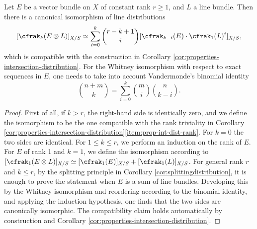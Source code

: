 \begin{proposition}\label{prop:Cherntensorproductwithline}
Let $E$ be a vector bundle on $X$ of constant rank $r\geq 1$, and $L$ a line bundle. Then there is a canonical isomorphism of line distributions
\begin{equation}\label{eq:ck-tensor-product}
[\cfrak_k(E \otimes L)]_{X/S} \simeq \sum_{i=0}^{k} \binom{r-k+1}{i} [\cfrak_{k-i}(E) \cdot \cfrak_1(L)^{i}]_{X/S},
\end{equation}
which is compatible with the construction in Corollary \ref{cor:properties-intersection-distribution}. For the Whitney isomorphism with respect to exact sequences in $E$, one needs to take into account Vandermonde's binomial identity
\begin{displaymath}
\binom{n + m}{k} = \sum_{i=0}^k \binom{m}{i}\binom{n}{k-i}.
\end{displaymath}
\end{proposition}
\begin{proof}
First of all, if $k > r$, the right-hand side is identically zero, and we define the isomorphism to be the one compatible with the rank triviality in Corollary \ref{cor:properties-intersection-distribution}\eqref{item:prop-int-dist-rank}. For $k=0$ the two sides are identical. For $1\leq k\leq r$, we perform an induction on the rank of $E$. For $E$ of rank 1 and $k=1$, we define the isomorphism according to $[\cfrak_{1}(E\otimes L)]_{X/S}\simeq [\cfrak_{1}(E)]_{X/S} + [\cfrak_{1}(L)]_{X/S}$. For general rank $r$ and $k\leq r$, by the splitting principle in Corollary \ref{cor:splittingdistribution}, it is enough to prove the statement when $E$ is a sum of line bundles. Developing this by the Whitney isomorphism and reordering according to the binomial identity, and applying the induction hypothesis, one finds that the two sides are canonically isomorphic. The compatibility claim holds automatically by construction and Corollary \ref{cor:properties-intersection-distribution}.
\end{proof}

